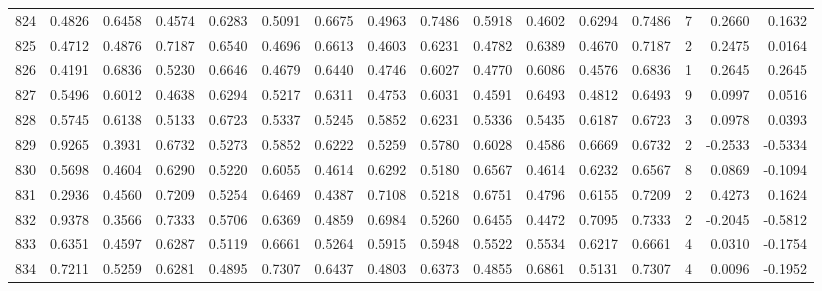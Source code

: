 \begin{tabular}{lrrrrrrrrrrrrrrr}
824 &      0.4826 &  0.6458 &  0.4574 &  0.6283 &  0.5091 &  0.6675 &  0.4963 &  0.7486 &  0.5918 &  0.4602 &   0.6294 &     0.7486 &      7 &                    0.2660 &                     0.1632 \\
825 &      0.4712 &  0.4876 &  0.7187 &  0.6540 &  0.4696 &  0.6613 &  0.4603 &  0.6231 &  0.4782 &  0.6389 &   0.4670 &     0.7187 &      2 &                    0.2475 &                     0.0164 \\
826 &      0.4191 &  0.6836 &  0.5230 &  0.6646 &  0.4679 &  0.6440 &  0.4746 &  0.6027 &  0.4770 &  0.6086 &   0.4576 &     0.6836 &      1 &                    0.2645 &                     0.2645 \\
827 &      0.5496 &  0.6012 &  0.4638 &  0.6294 &  0.5217 &  0.6311 &  0.4753 &  0.6031 &  0.4591 &  0.6493 &   0.4812 &     0.6493 &      9 &                    0.0997 &                     0.0516 \\
828 &      0.5745 &  0.6138 &  0.5133 &  0.6723 &  0.5337 &  0.5245 &  0.5852 &  0.6231 &  0.5336 &  0.5435 &   0.6187 &     0.6723 &      3 &                    0.0978 &                     0.0393 \\
829 &      0.9265 &  0.3931 &  0.6732 &  0.5273 &  0.5852 &  0.6222 &  0.5259 &  0.5780 &  0.6028 &  0.4586 &   0.6669 &     0.6732 &      2 &                   -0.2533 &                    -0.5334 \\
830 &      0.5698 &  0.4604 &  0.6290 &  0.5220 &  0.6055 &  0.4614 &  0.6292 &  0.5180 &  0.6567 &  0.4614 &   0.6232 &     0.6567 &      8 &                    0.0869 &                    -0.1094 \\
831 &      0.2936 &  0.4560 &  0.7209 &  0.5254 &  0.6469 &  0.4387 &  0.7108 &  0.5218 &  0.6751 &  0.4796 &   0.6155 &     0.7209 &      2 &                    0.4273 &                     0.1624 \\
832 &      0.9378 &  0.3566 &  0.7333 &  0.5706 &  0.6369 &  0.4859 &  0.6984 &  0.5260 &  0.6455 &  0.4472 &   0.7095 &     0.7333 &      2 &                   -0.2045 &                    -0.5812 \\
833 &      0.6351 &  0.4597 &  0.6287 &  0.5119 &  0.6661 &  0.5264 &  0.5915 &  0.5948 &  0.5522 &  0.5534 &   0.6217 &     0.6661 &      4 &                    0.0310 &                    -0.1754 \\
834 &      0.7211 &  0.5259 &  0.6281 &  0.4895 &  0.7307 &  0.6437 &  0.4803 &  0.6373 &  0.4855 &  0.6861 &   0.5131 &     0.7307 &      4 &                    0.0096 &                    -0.1952 \\

\end{tabular}
